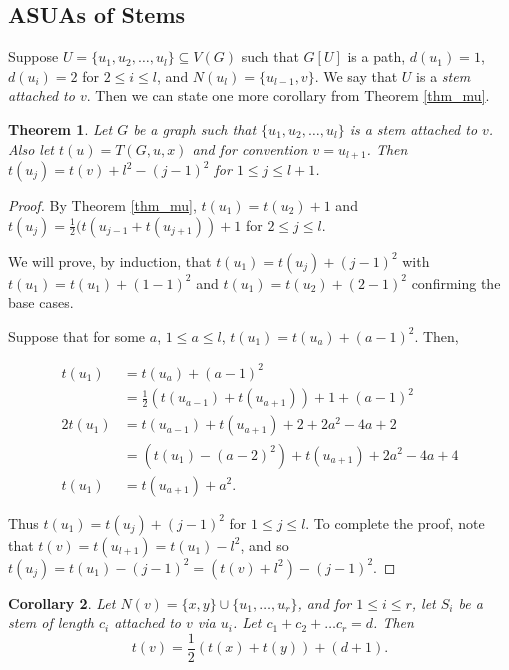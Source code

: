 \documentclass{article}
\newtheorem{theorem}{Theorem}[section]  %
\newtheorem{corollary}[theorem]{Corollary}
\theoremstyle{definition}
\begin{document}
\subsection{ASUAs of Stems}

\noindent Suppose $U = \{u_1, u_2, \ldots, u_l\} \subseteq V(G)$ such that $G[U]$ is a path, $d(u_1) = 1$, $d(u_i) = 2$ for $2 \leq i \leq l$, and $N(u_l) = \{u_{l-1},v \}$. We say that $U$ is a \emph{stem attached to $v$}. Then we can state one more corollary from Theorem \ref{thm_mu}.


\begin{theorem}
\label{thm_stems}
\noindent Let $G$ be a graph such that $\{u_1, u_2, \ldots, u_l\}$ is a stem attached to $v$. Also let $t(u) = T(G,u,x)$ and for convention $v = u_{l+1}$. Then $t(u_j) = t(v) + l^2 - (j-1)^2$ for $1 \leq j \leq l + 1$.
\end{theorem}

\begin{proof}
By Theorem \ref{thm_mu}, $t(u_1) = t(u_2) + 1$ and $t(u_j)  = \frac{1}{2}(t(u_{j-1} + t(u_{j+1})) + 1$ for $2 \leq j \leq l$.  

\noindent We will prove, by induction, that $t(u_1) = t(u_j) + (j-1)^2$ with $t(u_1) = t(u_1) + (1-1)^2$ and $t(u_1) = t(u_2) + (2-1)^2$ confirming the base cases.

\noindent Suppose that for some $a$, $1 \leq a \leq l$, $t(u_1) = t(u_a) + (a-1)^2$. Then,

\begin{align*}
    t(u_1) & = t(u_a) + (a-1)^2 \\
        & =  \frac{1}{2}(t(u_{a-1}) + t(u_{a+1})) + 1 + (a-1)^2 \\
    2t(u_1) & = t(u_{a-1}) + t(u_{a+1}) + 2 + 2a^2 -4a + 2 \\
            & = (t(u_1) - (a-2)^2) + t(u_{a+1}) + 2a^2 - 4a + 4 \\
    t(u_1) & = t(u_{a+1}) + a^2.
\end{align*}

\noindent Thus $t(u_1) = t(u_j) + (j-1)^2$ for $1 \leq j \leq l$. To complete the proof, note that $t(v) = t(u_{l+1}) = t(u_1) - l^2$, and so $t(u_j) =  t(u_1) - (j-1)^2 = (t(v) + l^2) - (j-1)^2$.

\end{proof}


\begin{corollary}
\label{cor_sd4}
    Let $N(v) = \{x,y\}\cup\{u_1,\ldots,u_r\}$, and for $1\leq i \leq r$, let $S_i$ be a stem of length $c_i$ attached to $v$ via $u_i$. Let $c_1 + c_2 + \ldots c_r = d$. Then 
    \[t(v) = \dfrac{1}{2}(t(x) + t(y)) + (d+1).\]
\end{corollary}
\end{document}

